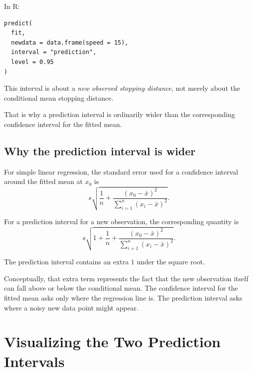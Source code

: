 \documentclass[11pt]{report}
\begin{document}
In R:

\begin{lstlisting}
predict(
  fit,
  newdata = data.frame(speed = 15),
  interval = "prediction",
  level = 0.95
)
\end{lstlisting}

This interval is about a \emph{new observed stopping distance}, not merely about the conditional mean stopping distance.

That is why a prediction interval is ordinarily wider than the corresponding confidence interval for the fitted mean.

\subsection{Why the prediction interval is wider}

For simple linear regression, the standard error used for a confidence interval around the fitted mean at \(x_0\) is
\[
s
\sqrt{
\frac{1}{n}
+
\frac{(x_0-\bar{x})^2}
{\sum_{i=1}^{n}(x_i-\bar{x})^2}
}.
\]

For a prediction interval for a new observation, the corresponding quantity is
\[
s
\sqrt{
1+
\frac{1}{n}
+
\frac{(x_0-\bar{x})^2}
{\sum_{i=1}^{n}(x_i-\bar{x})^2}
}.
\]

The prediction interval contains an extra \(1\) under the square root.

Conceptually, that extra term represents the fact that the new observation itself can fall above or below the conditional mean. The confidence interval for the fitted mean asks only where the regression line is. The prediction interval asks where a noisy new data point might appear.

\begin{center}
\end{center}

\section{Visualizing the Two Prediction Intervals}
\end{document}
